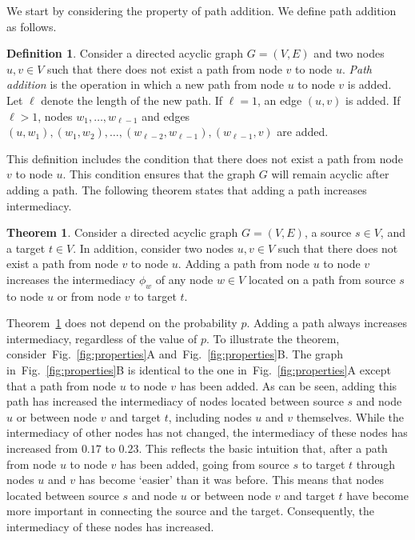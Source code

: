 \documentclass[9pt,twocolumn,twoside]{pnas-alt} %
\theoremstyle{definition}
\newtheorem{definition}{Definition}
\newtheorem{theorem}{Theorem}
\newcommand{\subfigref}[2]{Fig.~\ref{fig:#1}#2\xspace}
\newcommand{\theref}[1]{Theorem~\ref{the:#1}\xspace}
\begin{document}
We start by considering the property of path addition. We define path addition as follows.

\begin{definition}
    Consider a directed acyclic graph $G = (V, E)$ and two nodes $u, v \in V$ such that there does not exist a path from node $v$ to node $u$. \emph{Path addition} is the operation in which a new path from node $u$ to node $v$ is added. Let $\ell$ denote the length of the new path. If $\ell = 1$, an edge $(u, v)$ is added. If $\ell > 1$, nodes $w_1, \ldots, w_{\ell - 1}$ and edges $(u, w_1), (w_1, w_2), \ldots, (w_{\ell - 2}, w_{\ell - 1}), (w_{\ell - 1}, v)$ are added.
\end{definition}

This definition includes the condition that there does not exist a path from node $v$ to node $u$. This condition ensures that the graph $G$ will remain acyclic after adding a path. The following theorem states that adding a path increases intermediacy.

\begin{theorem}
    Consider a directed acyclic graph $G = (V, E)$, a source $s \in V$, and a target $t \in V$. In addition, consider two nodes $u, v \in V$ such that there does not exist a path from node $v$ to node $u$. Adding a path from node $u$ to node $v$ increases the intermediacy $\phi_w$ of any node $w \in V$ located on a path from source $s$ to node $u$ or from node $v$ to target $t$.
    \label{the:add}
\end{theorem}

\theref{add} does not depend on the probability $p$. Adding a path always increases intermediacy, regardless of the value of $p$. To illustrate the theorem, consider~\subfigref{properties}{A} and~\subfigref{properties}{B}. The graph in~\subfigref{properties}{B} is identical to the one in~\subfigref{properties}{A} except that a path from node $u$ to node $v$ has been added. As can be seen, adding this path has increased the intermediacy of nodes located between source $s$ and node $u$ or between node $v$ and target $t$, including nodes $u$ and $v$ themselves. While the intermediacy of other nodes has not changed, the intermediacy of these nodes has increased from $0.17$ to $0.23$. This reflects the basic intuition that, after a path from node $u$ to node $v$ has been added, going from source $s$ to target $t$ through nodes $u$ and $v$ has become `easier' than it was before. This means that nodes located between source $s$ and node $u$ or between node $v$ and target $t$ have become more important in connecting the source and the target. Consequently, the intermediacy of these nodes has increased.
\end{document}
